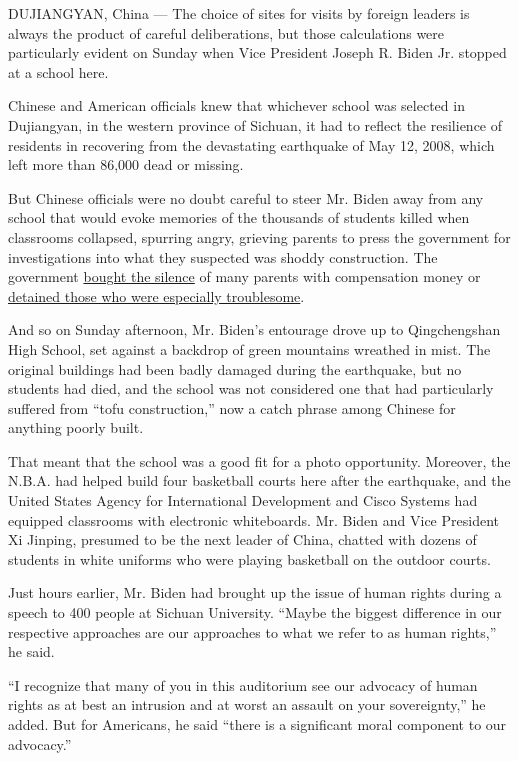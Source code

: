 DUJIANGYAN, China --- The choice of sites for visits by foreign leaders
is always the product of careful deliberations, but those calculations
were particularly evident on Sunday when Vice President Joseph R. Biden
Jr. stopped at a school here.

Chinese and American officials knew that whichever school was selected
in Dujiangyan, in the western province of Sichuan, it had to reflect the
resilience of residents in recovering from the devastating earthquake of
May 12, 2008, which left more than 86,000 dead or missing.

But Chinese officials were no doubt careful to steer Mr. Biden away from
any school that would evoke memories of the thousands of students killed
when classrooms collapsed, spurring angry, grieving parents to press the
government for investigations into what they suspected was shoddy
construction. The government
\href{http://www.nytimes3xbfgragh.onion/2008/07/24/world/asia/24quake.html}{bought
the silence} of many parents with compensation money or
\href{http://www.nytimes3xbfgragh.onion/2008/06/04/world/asia/04china.html}{detained
those who were especially troublesome}.

And so on Sunday afternoon, Mr. Biden's entourage drove up to
Qingchengshan High School, set against a backdrop of green mountains
wreathed in mist. The original buildings had been badly damaged during
the earthquake, but no students had died, and the school was not
considered one that had particularly suffered from ``tofu
construction,'' now a catch phrase among Chinese for anything poorly
built.

That meant that the school was a good fit for a photo opportunity.
Moreover, the N.B.A. had helped build four basketball courts here after
the earthquake, and the United States Agency for International
Development and Cisco Systems had equipped classrooms with electronic
whiteboards. Mr. Biden and Vice President Xi Jinping, presumed to be the
next leader of China, chatted with dozens of students in white uniforms
who were playing basketball on the outdoor courts.

Just hours earlier, Mr. Biden had brought up the issue of human rights
during a speech to 400 people at Sichuan University. ``Maybe the biggest
difference in our respective approaches are our approaches to what we
refer to as human rights,'' he said.

``I recognize that many of you in this auditorium see our advocacy of
human rights as at best an intrusion and at worst an assault on your
sovereignty,'' he added. But for Americans, he said ``there is a
significant moral component to our advocacy.''

